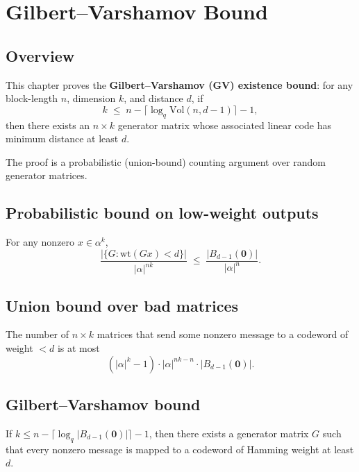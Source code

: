 \chapter{Gilbert--Varshamov Bound}
\section{Overview}

This chapter proves the \textbf{Gilbert--Varshamov (GV) existence bound}:
for any block-length $n$, dimension $k$, and distance $d$, if
\[
k \;\le\; n - \lceil\log_q \mathrm{Vol}(n,d-1)\rceil - 1,
\]
then there exists an $n\times k$ generator matrix whose associated linear code has
minimum distance at least $d$.

The proof is a probabilistic (union-bound) counting argument over random generator matrices.

\section{Probabilistic bound on low-weight outputs}

\begin{theorem}
\leanok
{}
For any nonzero $x\in\alpha^k$,
\[
\frac{|\{G : \mathrm{wt}(Gx) < d\}|}{|\alpha|^{nk}}
\;\le\;
\frac{|B_{d-1}(\mathbf{0})|}{|\alpha|^n}.
\]
\end{theorem}

\section{Union bound over bad matrices}

\begin{theorem}
\leanok
{}
The number of $n\times k$ matrices that send some nonzero message to a codeword of
weight $<d$ is at most
\[
(|\alpha|^k-1)\cdot|\alpha|^{nk-n}\cdot|B_{d-1}(\mathbf{0})|.
\]
\end{theorem}

\section{Gilbert--Varshamov bound}

\begin{theorem}
\leanok
{}
If $k \le n - \lceil\log_q|B_{d-1}(\mathbf{0})|\rceil - 1$, then there exists a
generator matrix $G$ such that every nonzero message is mapped to a codeword of
Hamming weight at least $d$.
\end{theorem}
